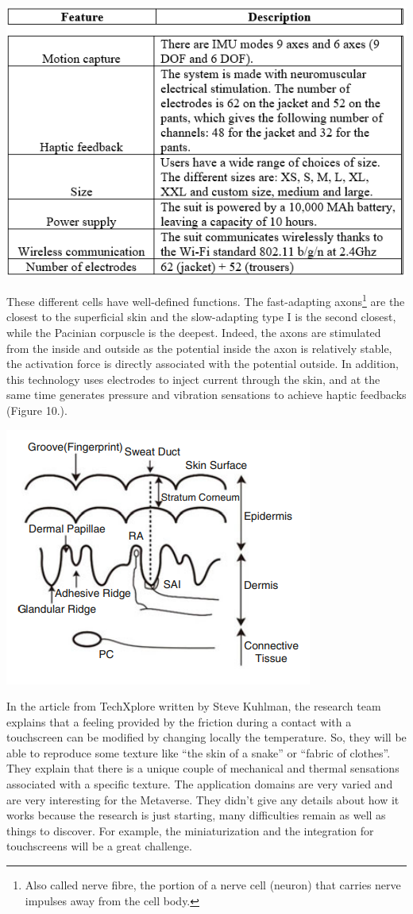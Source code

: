 \documentclass[12pt, a4paper]{article}
\begin{document}
\begin{multicols}{2}
\captionsetup{type=figure}
\includegraphics[width=.49\textwidth]{tableau-haptic-suit.PNG}
\vspace*{3mm}

\par These different cells have well-defined functions. The fast-adapting axons\footnote{Also called nerve fibre, the portion of a nerve cell (neuron) that carries nerve impulses away from the cell body.} are the closest to the superficial skin and the slow-adapting type I is the second closest, while the Pacinian corpuscle is the deepest. Indeed, the axons are stimulated from the inside and outside as the potential inside the axon is relatively stable, the activation force is directly associated with the potential outside. In addition, this technology uses electrodes to inject current through the skin, and at the same time generates pressure and vibration sensations to achieve haptic feedbacks\cite{TBHMI} (Figure 10.).

\captionsetup{type=figure}
\includegraphics[width=.49\textwidth]{FES.png}
\vspace*{3mm}

\par In the article from TechXplore written by Steve Kuhlman, the research team explains that a feeling provided by the friction during a contact with a touchscreen can be modified by changing locally the temperature. So, they will be able to reproduce some texture like “the skin of a snake” or “fabric of clothes”. They explain that there is a unique couple of mechanical and thermal sensations associated with a specific texture. The application domains are very varied and are very interesting for the Metaverse. They didn’t give any details about how it works because the research is just starting, many difficulties remain as well as things to discover. For example, the miniaturization and the integration for touchscreens will be a great challenge\cite{haptic7}\cite{hapticTemperature}.


\end{multicols}
\end{document}

